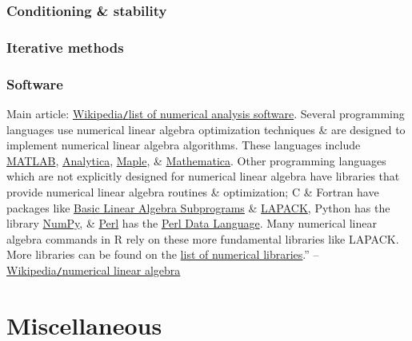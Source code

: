 \documentclass{article}
\begin{document}
\subsubsection{Conditioning \& stability}

\subsubsection{Iterative methods}

\subsubsection{Software}
Main article: \href{https://en.wikipedia.org/wiki/List_of_numerical_analysis_software}{Wikipedia{\tt/}list of numerical analysis software}. Several programming languages use numerical linear algebra optimization techniques \& are designed to implement numerical linear algebra algorithms. These languages include \href{https://en.wikipedia.org/wiki/MATLAB}{MATLAB}, \href{https://en.wikipedia.org/wiki/Analytica_(software)}{Analytica}, \href{https://en.wikipedia.org/wiki/Maple_(software)}{Maple}, \& \href{https://en.wikipedia.org/wiki/Mathematica}{Mathematica}. Other programming languages which are not explicitly designed for numerical linear algebra have libraries that provide numerical linear algebra routines \& optimization; C \& Fortran have packages like \href{https://en.wikipedia.org/wiki/Basic_Linear_Algebra_Subprograms}{Basic Linear Algebra Subprograms} \& \href{https://en.wikipedia.org/wiki/LAPACK}{LAPACK}, Python has the library \href{https://en.wikipedia.org/wiki/NumPy}{NumPy}, \& \href{https://en.wikipedia.org/wiki/Perl}{Perl} has the \href{https://en.wikipedia.org/wiki/Perl_Data_Language}{Perl Data Language}. Many numerical linear algebra commands in R rely on these more fundamental libraries like LAPACK. More libraries can be found on the \href{https://en.wikipedia.org/wiki/List_of_numerical_libraries}{list of numerical libraries}.'' -- \href{https://en.wikipedia.org/wiki/Numerical_linear_algebra}{Wikipedia{\tt/}numerical linear algebra}


\section{Miscellaneous}


\printbibliography[heading=bibintoc]
	
\end{document}

